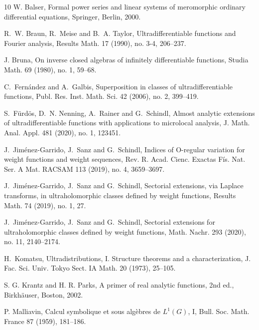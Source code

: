 \documentclass[11pt,a4paper]{article}
\theoremstyle{plain}
\theoremstyle{definition}
\begin{document}

\begin{thebibliography}{10}
	 W. Balser, {Formal power series and linear systems of meromorphic ordinary differential equations}, Springer, Berlin, 2000.

	R.~W. Braun, R.~Meise and B.~A. Taylor, Ultradifferentiable functions and Fourier analysis, Results Math. 17 (1990), no. 3-4, 206--237.

     J. Bruna, On inverse closed algebras of infinitely differentiable functions, Studia Math. 69 (1980), no. 1, 59--68.

	C.~Fernández and A.~Galbis, Superposition in classes of ultradifferentiable functions, Publ. Res. Inst. Math. Sci. 42 (2006), no. 2, 399--419.
	
	S.~F\"{u}rd\"{o}s, D.~N. Nenning, A.~Rainer and G.~Schindl, Almost analytic extensions of ultradifferentiable functions with applications to microlocal analysis,
	J. Math. Anal. Appl. 481 (2020), no. 1, 123451.
	
	J.~Jim{\'e}nez-Garrido, J.~Sanz and G.~Schindl, Indices of O-regular variation for weight functions and weight sequences, Rev. R. Acad. Cienc. Exactas Fís. Nat. Ser. A Mat. RACSAM 113 (2019), no. 4, 3659--3697.
	
	J.~Jim{\'e}nez-Garrido, J.~Sanz and G.~Schindl, Sectorial extensions, via Laplace transforms, in ultraholomorphic
	classes defined by weight functions, Results Math. 74 (2019), no. 1, 27.
	
	J.~Jim{\'e}nez-Garrido, J.~Sanz and G.~Schindl, Sectorial extensions for ultraholomorphic classes defined by weight	 functions, Math. Nachr. 293 (2020), no. 11, 2140--2174.
	
	
	H.~Komatsu, Ultradistributions, I. Structure theorems and a characterization, J. Fac. Sci. Univ. Tokyo Sect. IA Math. 20 (1973), 25--105.

	S. G. Krantz and H. R. Parks, A primer of real analytic functions, 2nd ed., Birkhäuser, Boston, 2002.

	 P. Malliavin, Calcul symbolique et sous alg\`ebres de $L^1(G)$, I, Bull. Soc. Math. France 87 (1959), 181--186.


\end{thebibliography}
\end{document}
